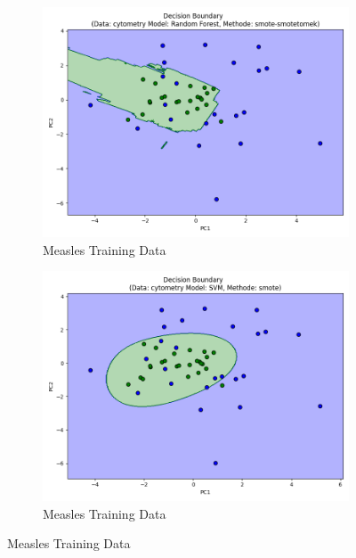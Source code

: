 \documentclass[12pt,a4paper]{report}
\begin{document}
\begin{figure}[h!]
    \centering

    \begin{subfigure}[b]{0.49\textwidth}
        \centering
        \includegraphics[width=\textwidth]{images/train_decision_boundary_M.png}
        \caption{Measles Training Data}
        \label{fig:train_decision_boundary_M}
    \end{subfigure}
    \hfill
    \begin{subfigure}[b]{0.49\textwidth}
        \centering
        \includegraphics[width=\linewidth]{images/train2_decision_boundary_M.png}
        \caption{Measles Training Data}
        \label{fig:train2_decision_boundary_M}
    \end{subfigure}


\end{figure}
\end{document}
